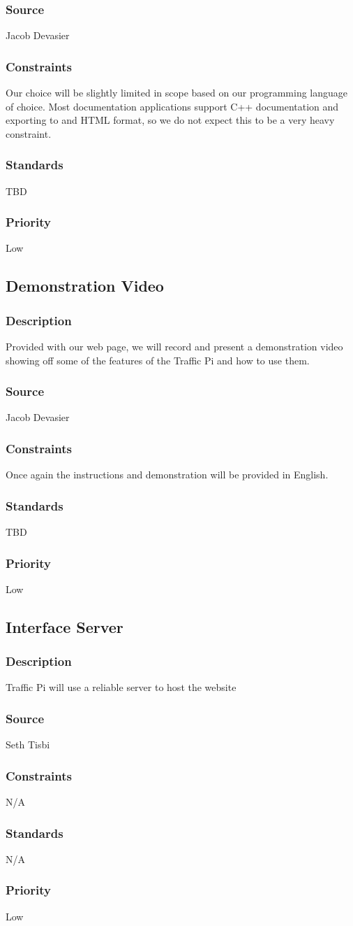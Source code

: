 \subsubsection{Source}
Jacob Devasier
\subsubsection{Constraints}
Our choice will be slightly limited in scope based on our programming language of choice. Most documentation applications support C++ documentation and exporting to and HTML format, so we do not expect this to be a very heavy constraint.
\subsubsection{Standards}
TBD
\subsubsection{Priority}
Low

\subsection{Demonstration Video}
\subsubsection{Description}
Provided with our web page, we will record and present a demonstration video showing off some of the features of the Traffic Pi and how to use them.
\subsubsection{Source}
Jacob Devasier
\subsubsection{Constraints}
Once again the instructions and demonstration will be provided in English.
\subsubsection{Standards}
TBD
\subsubsection{Priority}
Low

\subsection{Interface Server}
\subsubsection{Description}
Traffic Pi will use a reliable server to host the website
\subsubsection{Source}
Seth Tisbi
\subsubsection{Constraints}
N/A
\subsubsection{Standards}
N/A
\subsubsection{Priority}
Low
